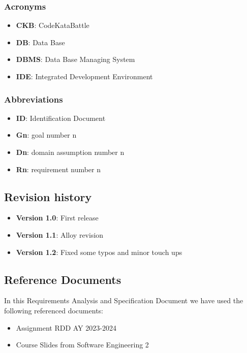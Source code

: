 \documentclass[12pt,oneside,a4paper]{article}
\begin{document}
\subsubsection{Acronyms}
\begin{itemize}
    \item \textbf{CKB}: CodeKataBattle
    \item \textbf{DB}: Data Base
    \item \textbf{DBMS}: Data Base Managing System
    \item \textbf{IDE}: Integrated Development Environment
\end{itemize}
\subsubsection{Abbreviations}
\begin{itemize}
    \item \textbf{ID}: Identification Document
    \item \textbf{Gn}: goal number n
    \item \textbf{Dn}: domain assumption number n
    \item \textbf{Rn}: requirement number n
\end{itemize}
\subsection{Revision history}
\begin{itemize}
    \item \textbf{Version 1.0}: First release
    \item \textbf{Version 1.1}: Alloy revision
    \item \textbf{Version 1.2}: Fixed some typos and minor touch ups
\end{itemize}

\subsection{Reference Documents}
In this Requirements Analysis and Specification Document we have used the following referenced documents:

\begin{itemize}
    \item Assignment RDD AY 2023-2024
    \item Course Slides from Software Engineering 2
\end{itemize}
\end{document}

